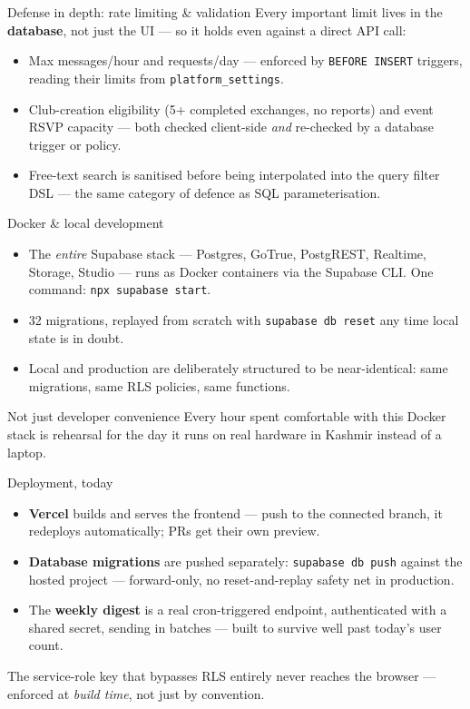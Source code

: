 \documentclass[aspectratio=169,11pt]{beamer}
\newcommand{\code}[1]{\textcolor{olkTealDark}{\texttt{#1}}}
\begin{document}
\begin{frame}{Defense in depth: rate limiting \& validation}
  Every important limit lives in the \textbf{database}, not just the UI --- so it holds even against a direct API call:
  \begin{itemize}
    \item Max messages/hour and requests/day --- enforced by \code{BEFORE INSERT} triggers, reading their limits from \code{platform\_settings}.
    \item Club-creation eligibility (5+ completed exchanges, no reports) and event RSVP capacity --- both checked client-side \emph{and} re-checked by a database trigger or policy.
    \item Free-text search is sanitised before being interpolated into the query filter DSL --- the same category of defence as SQL parameterisation.
  \end{itemize}
\end{frame}

\begin{frame}{Docker \& local development}
  \begin{itemize}
    \item The \emph{entire} Supabase stack --- Postgres, GoTrue, PostgREST, Realtime, Storage, Studio --- runs as Docker containers via the Supabase CLI. One command: \code{npx supabase start}.
    \item 32 migrations, replayed from scratch with \code{supabase db reset} any time local state is in doubt.
    \item Local and production are deliberately structured to be near-identical: same migrations, same RLS policies, same functions.
  \end{itemize}
  \vfill
  \begin{alertblock}{Not just developer convenience}
    Every hour spent comfortable with this Docker stack is rehearsal for the day it runs on real hardware in Kashmir instead of a laptop.
  \end{alertblock}
\end{frame}

\begin{frame}{Deployment, today}
  \begin{itemize}
    \item \textbf{Vercel} builds and serves the frontend --- push to the connected branch, it redeploys automatically; PRs get their own preview.
    \item \textbf{Database migrations} are pushed separately: \code{supabase db push} against the hosted project --- forward-only, no reset-and-replay safety net in production.
    \item The \textbf{weekly digest} is a real cron-triggered endpoint, authenticated with a shared secret, sending in batches --- built to survive well past today's user count.
  \end{itemize}
  \vfill
  \small The service-role key that bypasses RLS entirely never reaches the browser --- enforced at \emph{build time}, not just by convention.
\end{frame}
\end{document}
